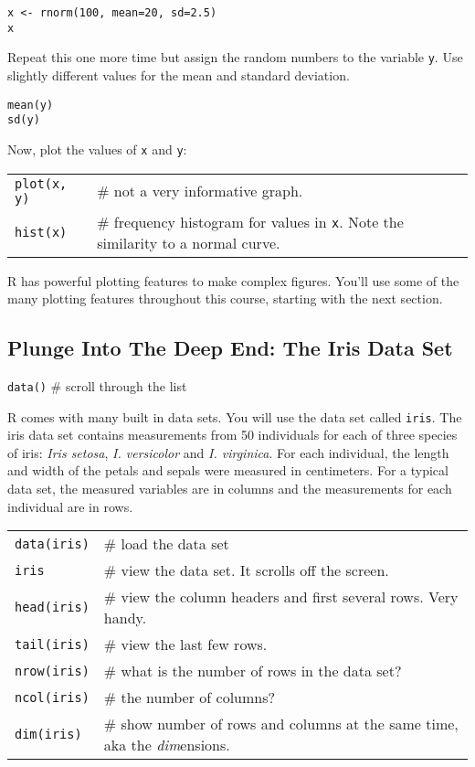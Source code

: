 \documentclass[11pt]{article}
\begin{document}
\texttt{x \textless{}- rnorm(100, mean=20, sd=2.5)} \\
\texttt{x}

Repeat this one more time but assign the random numbers to the variable
\texttt{y}. Use slightly different values for the mean and standard deviation.

\texttt{mean(y)} \\
\texttt{sd(y)}

Now, plot the values of \texttt{x} and \texttt{y}:

\begin{tabular}{@{}L{1in}L{4.5in}@{}}
\texttt{plot(x, y)} & \# not a very informative graph. \\
\texttt{hist(x)} 	& \# frequency histogram for values in \texttt{x}. Note the similarity to a normal curve.\\
\end{tabular}

R has powerful plotting features to make complex figures.
You'll use some of the many plotting features throughout this course,
starting with the next section.

\subsection*{Plunge Into The Deep End: The Iris Data Set}

\texttt{data()} \# scroll through the list

R comes with many built in data sets. You will use the data set called
\texttt{iris}. The iris data set contains measurements from 50 individuals for
each of three species of iris: \emph{Iris setosa}, \emph{I. versicolor}
and \emph{I. virginica}. For each individual, the length and width of
the petals and sepals were measured in centimeters. For a typical data
set, the measured variables are in columns and the measurements for each
individual are in rows.

\begin{tabular}{@{}L{1in}L{4.5in}@{}}
\texttt{data(iris)} 	& \# load the data set \\

\texttt{iris} 			& \# view the data set. It scrolls off the screen. \\

\texttt{head(iris)} 	& \# view the column headers and first several rows. Very
handy.\\

\texttt{tail(iris)}		& \# view the last few rows. \\

\texttt{nrow(iris)} 	& \# what is the number of rows in the data set?\\

\texttt{ncol(iris)} 	& \# the number of columns? \\

\texttt{dim(iris)} 		& \# show number of rows and columns at the same time, aka the \emph{dim}ensions.\\
\end{tabular}
\end{document}
